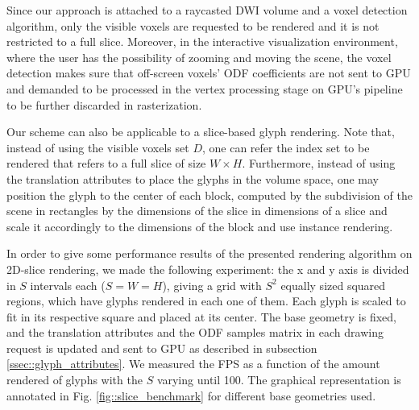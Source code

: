 \documentclass[twoside,twocolumn,10pt]{article}
\begin{document}


Since our approach is attached to a raycasted DWI volume and a voxel detection algorithm, only the visible voxels are requested to be rendered and it is not restricted to a full slice. Moreover, in the interactive visualization environment, where the user has the possibility of zooming and moving the scene, the voxel detection makes sure that off-screen voxels' ODF coefficients are not sent to GPU and demanded to be processed in the vertex processing stage on GPU's pipeline to be further discarded in rasterization.


Our scheme can also be applicable to a slice-based glyph rendering. Note that, instead of using the visible voxels set $D$, one can refer the index set to be rendered that refers to a full slice of size $W \times H$. Furthermore, instead of using the translation attributes to place the glyphs in the volume space, one may position the glyph to the center of each block, computed by the subdivision of the scene in rectangles by the dimensions of the slice in dimensions of a slice and scale it accordingly to the dimensions of the block and use instance rendering.

In order to give some performance results of the presented rendering algorithm on 2D-slice rendering, we made the following experiment: the x and y axis is divided in $S$ intervals each ($S = W = H$), giving a grid with $S^2$ equally sized squared regions, which have glyphs rendered in each one of them. Each glyph is scaled to fit in its respective square and placed at its center. The base geometry is fixed, and the translation attributes and the ODF samples matrix in each drawing request is updated and sent to GPU as described in subsection \ref{ssec::glyph_attributes}. We measured the FPS as a function of the amount rendered of glyphs with the $S$ varying until 100. The graphical representation is annotated in Fig. \ref{fig::slice_benchmark} for different base geometries used.
\end{document}
